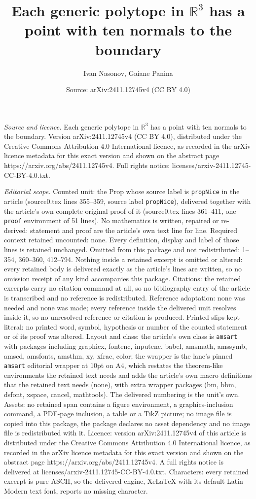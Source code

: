 \documentclass[10pt,a4paper]{amsart}
\title[Each generic polytope in $\mathbb{R}^3$ has a point with ten]{Each generic polytope in $\mathbb{R}^3$ has a point with ten normals to the boundary}
\author{Ivan Nasonov, Gaiane Panina}
\date{Source: arXiv:2411.12745v4 (CC BY 4.0)}
\begin{document}
\maketitle

\noindent\emph{Source and licence.} Each generic polytope in $\mathbb{R}^3$ has a point with ten normals to the boundary. Version arXiv:2411.12745v4 (CC BY 4.0), distributed under the Creative Commons Attribution 4.0 International licence, as recorded in the arXiv licence metadata for this exact version and shown on the abstract page https://arxiv.org/abs/2411.12745v4. Full rights notice: licenses/arxiv-2411.12745-CC-BY-4.0.txt.\par\smallskip

\noindent\textit{Editorial scope.} Counted unit: the Prop whose source label is \texttt{propNice} in the article (source0.tex lines 355--359, source label \texttt{propNice}), delivered together with the article's own complete original proof of it (source0.tex lines 361--411, one \texttt{proof} environment of 51 lines). No mathematics is written, repaired or re-derived: statement and proof are the article's own text line for line. Required context retained uncounted: none. Every definition, display and label of those lines is retained unchanged. Omitted from this package and not redistributed: 1--354, 360--360, 412--794. Nothing inside a retained excerpt is omitted or altered: every retained body is delivered exactly as the article's lines are written, so no omission receipt of any kind accompanies this package. Citations: the retained excerpts carry no citation command at all, so no bibliography entry of the article is transcribed and no reference is redistributed. Reference adaptation: none was needed and none was made; every reference inside the delivered unit resolves inside it, so no unresolved reference or citation is produced. Printed slips kept literal: no printed word, symbol, hypothesis or number of the counted statement or of its proof was altered. Layout and class: the article's own class is \texttt{amsart} with packages including graphicx, fontenc, inputenc, babel, amsmath, amssymb, amscd, amsfonts, amsthm, xy, xfrac, color; the wrapper is the lane's pinned \texttt{amsart} editorial wrapper at 10pt on A4, which restates the theorem-like environments the retained text needs and adds the article's own macro definitions that the retained text needs (none), with extra wrapper packages (bm, bbm, dsfont, xspace, cancel, mathtools). The delivered numbering is the unit's own. Assets: no retained span contains a figure environment, a graphics-inclusion command, a PDF-page inclusion, a table or a TikZ picture; no image file is copied into this package, the package declares no asset dependency and no image file is redistributed with it. Licence: version arXiv:2411.12745v4 of this article is distributed under the Creative Commons Attribution 4.0 International licence, as recorded in the arXiv licence metadata for this exact version and shown on the abstract page https://arxiv.org/abs/2411.12745v4. A full rights notice is delivered at licenses/arxiv-2411.12745-CC-BY-4.0.txt. Characters: every retained excerpt is pure ASCII, so the delivered engine, XeLaTeX with its default Latin Modern text font, reports no missing character.
\end{document}
